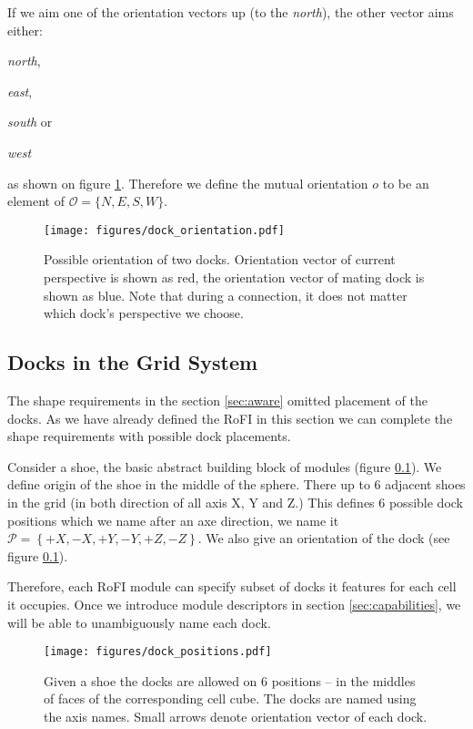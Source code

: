 If we aim one of the orientation vectors up (to the \emph{north}), the other
vector aims either:
\begin{enumerate*}
    \item \emph{north},
    \item \emph{east},
    \item \emph{south} or
    \item \emph{west}
\end{enumerate*}
as shown on figure \ref{fig:dock_orientation}. Therefore we define the mutual
orientation $o$ to be an element of $\mathcal{O} = \{N, E, S, W\}$.

\begin{figure}[h!]
    \centering
    \texttt{[image: figures/dock\_orientation.pdf]}
    \caption{Possible orientation of two docks. Orientation vector of current
    perspective is shown as red, the orientation vector of mating dock is shown
    as blue. Note that during a connection, it does not matter which dock's
    perspective we choose.}
    \label{fig:dock_orientation}
\end{figure}


\subsection{Docks in the Grid System}\label{sec:dock_in_grid}

The shape requirements in the section \ref{sec:aware} omitted placement of the
docks. As we have already defined the RoFI in this section we can complete the
shape requirements with possible dock placements.

Consider a shoe, the basic abstract building block of modules (figure
\ref{sec:dock_in_grid}). We define origin of the shoe in the middle of the
sphere. There up to 6 adjacent shoes in the grid (in both direction of all axis
X, Y and Z.) This defines 6 possible dock positions which we name after an axe
direction, we name it $\mathcal{P} = \left\{+X, -X, +Y, -Y, +Z, -Z\right\}$. We
also give an orientation of the dock (see figure \ref{sec:dock_in_grid}).

Therefore, each RoFI module can specify subset of docks it features for each
cell it occupies. Once we introduce module descriptors in section
\ref{sec:capabilities}, we will be able to unambiguously name each dock.

\begin{figure}[h!]
    \centering
    \texttt{[image: figures/dock\_positions.pdf]}
    \caption{Given a shoe the docks are allowed on 6 positions -- in the
    middles of faces of the corresponding cell cube. The docks are named using
    the axis names. Small arrows denote orientation vector of each dock.}
    \label{fig:dock_positions}
\end{figure}


